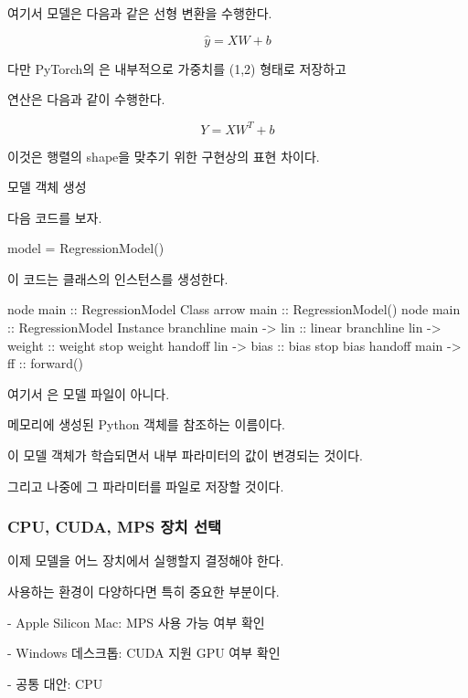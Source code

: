 여기서 모델은 다음과 같은 선형 변환을 수행한다.

\[
\hat{y}=XW+b
\]

다만 PyTorch의 은 내부적으로 가중치를 (1,2) 형태로 저장하고

연산은 다음과 같이 수행한다.

\[
Y=XW^{T}+b
\]

이것은 행렬의 shape을 맞추기 위한 구현상의 표현 차이다.

\begin{dhknote}
\begin{dhksmry}[centered]
모델 객체 생성
\end{dhksmry}
\end{dhknote}

다음 코드를 보자.

\begin{dhkcode}
model = RegressionModel()
\end{dhkcode}

이 코드는  클래스의 인스턴스를 생성한다.

\begin{dhkbranch}[in=8]
node main :: RegressionModel Class
arrow main :: RegressionModel()
node main :: RegressionModel Instance
branchline main -> lin :: linear
branchline lin -> weight :: weight
stop weight
handoff lin -> bias :: bias
stop bias
handoff main -> ff :: forward()
\end{dhkbranch}

여기서 은 모델 파일이 아니다.

메모리에 생성된 Python 객체를 참조하는 이름이다.

이 모델 객체가 학습되면서 내부 파라미터의 값이 변경되는 것이다.

그리고 나중에 그 파라미터를 파일로 저장할 것이다.

\subsubsection{CPU, CUDA, MPS 장치 선택}

이제 모델을 어느 장치에서 실행할지 결정해야 한다.

사용하는 환경이 다양하다면 특히 중요한 부분이다.

\begin{dhksmry}
    - Apple Silicon Mac: MPS 사용 가능 여부 확인

    - Windows 데스크톱: CUDA 지원 GPU 여부 확인

    - 공통 대안: CPU
\end{dhksmry}

